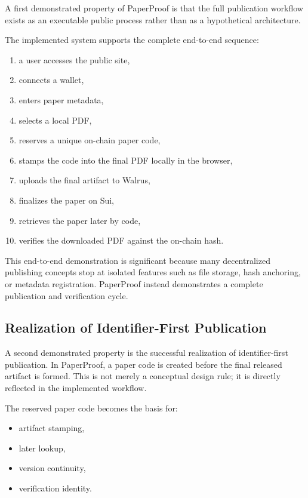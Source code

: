 \documentclass[journal]{IEEEtran}
\begin{document}
A first demonstrated property of PaperProof is that the full publication workflow exists as an executable public process rather than as a hypothetical architecture.

The implemented system supports the complete end-to-end sequence:

\begin{enumerate}
    \item a user accesses the public site,
    \item connects a wallet,
    \item enters paper metadata,
    \item selects a local PDF,
    \item reserves a unique on-chain paper code,
    \item stamps the code into the final PDF locally in the browser,
    \item uploads the final artifact to Walrus,
    \item finalizes the paper on Sui,
    \item retrieves the paper later by code,
    \item verifies the downloaded PDF against the on-chain hash.
\end{enumerate}

This end-to-end demonstration is significant because many decentralized publishing concepts stop at isolated features such as file storage, hash anchoring, or metadata registration. PaperProof instead demonstrates a complete publication and verification cycle.

\subsection{Realization of Identifier-First Publication}

A second demonstrated property is the successful realization of identifier-first publication. In PaperProof, a paper code is created before the final released artifact is formed. This is not merely a conceptual design rule; it is directly reflected in the implemented workflow.

The reserved paper code becomes the basis for:
\begin{itemize}
    \item artifact stamping,
    \item later lookup,
    \item version continuity,
    \item verification identity.
\end{itemize}
\end{document}
